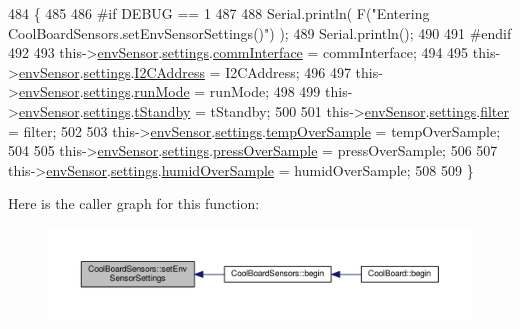 \begin{DoxyCode}
484 \{
485 
486 \textcolor{preprocessor}{#if DEBUG == 1}
487     
488     Serial.println( F(\textcolor{stringliteral}{"Entering CoolBoardSensors.setEnvSensorSettings()"}) );
489     Serial.println();
490 
491 \textcolor{preprocessor}{#endif}
492   
493     this->\hyperlink{class_cool_board_sensors_a868e38985e9a2412829fa2790ca13e2e}{envSensor}.\hyperlink{class_b_m_e280_af06253eb2f8ad4b5fabb858bc4a973bf}{settings}.\hyperlink{struct_sensor_settings_a5bf116387c543a6ea5732976424e8cb1}{commInterface} = commInterface;      
494 
495     this->\hyperlink{class_cool_board_sensors_a868e38985e9a2412829fa2790ca13e2e}{envSensor}.\hyperlink{class_b_m_e280_af06253eb2f8ad4b5fabb858bc4a973bf}{settings}.\hyperlink{struct_sensor_settings_af8103021dbce7e5ee6d786c4893324f7}{I2CAddress} = I2CAddress;
496 
497     this->\hyperlink{class_cool_board_sensors_a868e38985e9a2412829fa2790ca13e2e}{envSensor}.\hyperlink{class_b_m_e280_af06253eb2f8ad4b5fabb858bc4a973bf}{settings}.\hyperlink{struct_sensor_settings_a0ffbdf34f4c23a2a167f00e4cb971dec}{runMode} = runMode; 
498 
499     this->\hyperlink{class_cool_board_sensors_a868e38985e9a2412829fa2790ca13e2e}{envSensor}.\hyperlink{class_b_m_e280_af06253eb2f8ad4b5fabb858bc4a973bf}{settings}.\hyperlink{struct_sensor_settings_a7098be3c1df0271dc9bc0fb45c1e9bb9}{tStandby} = tStandby; 
500 
501     this->\hyperlink{class_cool_board_sensors_a868e38985e9a2412829fa2790ca13e2e}{envSensor}.\hyperlink{class_b_m_e280_af06253eb2f8ad4b5fabb858bc4a973bf}{settings}.\hyperlink{struct_sensor_settings_a69dc95368069a0f408a141d4c2cbf045}{filter} = filter; 
502 
503     this->\hyperlink{class_cool_board_sensors_a868e38985e9a2412829fa2790ca13e2e}{envSensor}.\hyperlink{class_b_m_e280_af06253eb2f8ad4b5fabb858bc4a973bf}{settings}.\hyperlink{struct_sensor_settings_abdedc9d05f4850c58005313486958073}{tempOverSample} = tempOverSample;
504 
505     this->\hyperlink{class_cool_board_sensors_a868e38985e9a2412829fa2790ca13e2e}{envSensor}.\hyperlink{class_b_m_e280_af06253eb2f8ad4b5fabb858bc4a973bf}{settings}.\hyperlink{struct_sensor_settings_a85ba10cad25b479bba9cb42c6400ab21}{pressOverSample} = pressOverSample;
506 
507     this->\hyperlink{class_cool_board_sensors_a868e38985e9a2412829fa2790ca13e2e}{envSensor}.\hyperlink{class_b_m_e280_af06253eb2f8ad4b5fabb858bc4a973bf}{settings}.\hyperlink{struct_sensor_settings_a4a02fc7708071b88ccf610e3f7ed9d55}{humidOverSample} = humidOverSample;
508 
509 \}
\end{DoxyCode}
Here is the caller graph for this function\+:\nopagebreak
\begin{figure}[H]
\begin{center}
\leavevmode
\includegraphics[width=350pt]{de/d46/class_cool_board_sensors_a406307ffd70272282d91479c7ed8d66f_icgraph}
\end{center}
\end{figure}


